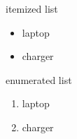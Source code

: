 \documentclass{article}  %
\begin{document}
 
{\large itemized list}
\begin{itemize}  
\item laptop  
\item charger  
\end{itemize}  
 
 
{\large enumerated list}
\begin{enumerate}  
\item laptop  
\item charger  
\end{enumerate}  
\end{document}

